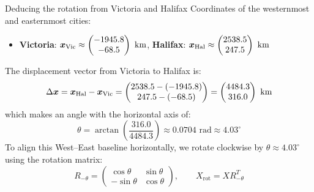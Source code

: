 \documentclass[aspectratio=169]{beamer}\usepackage[]{graphicx}\usepackage[]{xcolor}
\begin{document}
\begin{frame}{Deducing the rotation from Victoria and Halifax}
Coordinates of the westernmost and easternmost cities:
\begin{itemize}
\item \textbf{Victoria}: $\bm{x}_{\text{Vic}} \approx \begin{pmatrix} -1945.8 \\ -68.5 \end{pmatrix}\text{ km}$, \quad \textbf{Halifax}: $\bm{x}_{\text{Hal}} \approx \begin{pmatrix} 2538.5 \\ 247.5 \end{pmatrix}\text{ km}$
\end{itemize}
\vfill
The displacement vector from Victoria to Halifax is:
\[
\Delta\bm{x} = \bm{x}_{\text{Hal}} - \bm{x}_{\text{Vic}} = \begin{pmatrix} 2538.5 - (-1945.8) \\ 247.5 - (-68.5) \end{pmatrix} = \begin{pmatrix} 4484.3 \\ 316.0 \end{pmatrix}\text{ km}
\]
which makes an angle with the horizontal axis of:
\[
\theta = \arctan\left(\frac{316.0}{4484.3}\right) \approx 0.0704\text{ rad} \approx 4.03^\circ
\]
\vfill
To align this West--East baseline horizontally, we rotate clockwise by $\theta \approx 4.03^\circ$ using the rotation matrix:
\[
R_{-\theta} = \begin{pmatrix} \cos\theta & \sin\theta \\ -\sin\theta & \cos\theta \end{pmatrix}, \qquad X_{\text{rot}} = X R_{-\theta}^T
\]
\end{frame}
\end{document}
